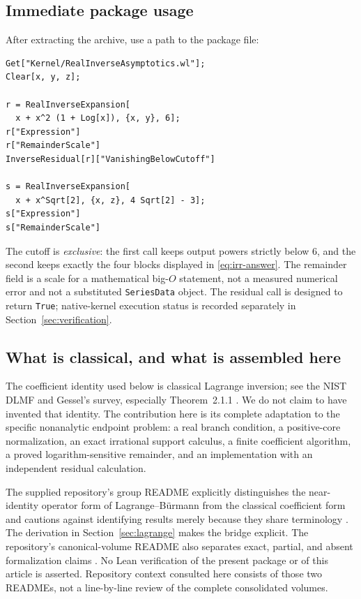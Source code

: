 \documentclass[11pt,a4paper]{article}
\numberwithin{equation}{section}
\theoremstyle{definition}
\newcommand{\code}[1]{\texttt{#1}}
\begin{document}
\subsection{Immediate package usage}
After extracting the archive, use a path to the package file:
\begin{lstlisting}
Get["Kernel/RealInverseAsymptotics.wl"];
Clear[x, y, z];

r = RealInverseExpansion[
  x + x^2 (1 + Log[x]), {x, y}, 6];
r["Expression"]
r["RemainderScale"]
InverseResidual[r]["VanishingBelowCutoff"]

s = RealInverseExpansion[
  x + x^Sqrt[2], {x, z}, 4 Sqrt[2] - 3];
s["Expression"]
s["RemainderScale"]
\end{lstlisting}
The cutoff is \emph{exclusive}: the first call keeps output powers strictly
below $6$, and the second keeps exactly the four blocks displayed in
\eqref{eq:irr-answer}. The remainder field is a scale for a mathematical
big-$O$ statement, not a measured numerical error and not a substituted
\code{SeriesData} object. The residual call is designed to return
\code{True}; native-kernel execution status is recorded separately in
Section~\ref{sec:verification}.

\subsection{What is classical, and what is assembled here}
The coefficient identity used below is classical Lagrange inversion;
see the NIST DLMF \cite{dlmf} and Gessel's survey, especially
Theorem~2.1.1 \cite{gessel}. We do not claim to have invented that identity.
The contribution here is its complete adaptation to the specific
nonanalytic endpoint problem: a real branch condition, a positive-core
normalization, an exact irrational support calculus, a finite coefficient
algorithm, a proved logarithm-sensitive remainder, and an implementation
with an independent residual calculation.

The supplied repository's group README explicitly distinguishes the
near-identity operator form of Lagrange--B\"urmann from the classical
coefficient form and cautions against identifying results merely because
they share terminology \cite{repo}. The derivation in
Section~\ref{sec:lagrange} makes the bridge explicit. The repository's
canonical-volume README also separates exact, partial, and absent
formalization claims \cite{repovol}. No Lean verification of the present
package or of this article is asserted. Repository context consulted here
consists of those two READMEs, not a line-by-line review of the complete
consolidated volumes.
\end{document}
